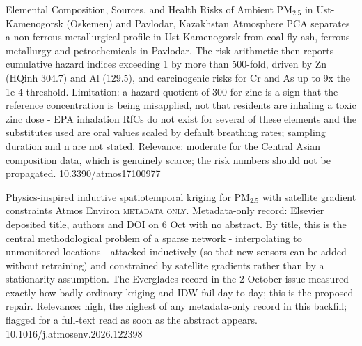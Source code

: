 \documentclass[10pt]{article}
\begin{document}
\par{}\baselineskip{}\baselineskip
{}

{Elemental Composition, Sources, and Health Risks of Ambient PM$_{2.5}$ in Ust-Kamenogorsk (Oskemen) and Pavlodar, Kazakhstan}
{Atmosphere}
{PCA separates a non-ferrous metallurgical profile in Ust-Kamenogorsk from coal fly ash, ferrous metallurgy and petrochemicals in Pavlodar. The risk arithmetic then reports cumulative hazard indices exceeding 1 by more than 500-fold, driven by Zn (HQinh 304.7) and Al (129.5), and carcinogenic risks for Cr and As up to 9x the 1e-4 threshold. Limitation: a hazard quotient of 300 for zinc is a sign that the reference concentration is being misapplied, not that residents are inhaling a toxic zinc dose - EPA inhalation RfCs do not exist for several of these elements and the substitutes used are oral values scaled by default breathing rates; sampling duration and n are not stated. Relevance: moderate for the Central Asian composition data, which is genuinely scarce; the risk numbers should not be propagated.}
{10.3390/atmos17100977}

{Physics-inspired inductive spatiotemporal kriging for PM$_{2.5}$ with satellite gradient constraints}
{Atmos Environ}
{\textsc{metadata only.} Metadata-only record: Elsevier deposited title, authors and DOI on 6 Oct with no abstract. By title, this is the central methodological problem of a sparse network - interpolating to unmonitored locations - attacked inductively (so that new sensors can be added without retraining) and constrained by satellite gradients rather than by a stationarity assumption. The Everglades record in the 2 October issue measured exactly how badly ordinary kriging and IDW fail day to day; this is the proposed repair. Relevance: high, the highest of any metadata-only record in this backfill; flagged for a full-text read as soon as the abstract appears.}
{10.1016/j.atmosenv.2026.122398}

\par{}\baselineskip{}\baselineskip
{}
\end{document}
